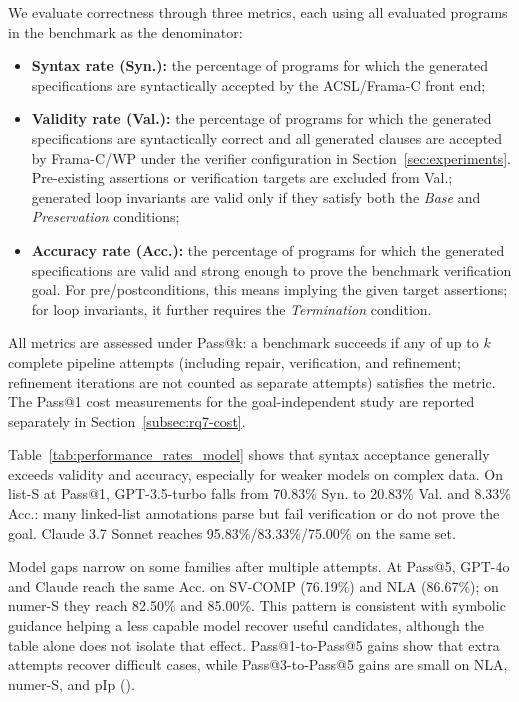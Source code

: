 We evaluate correctness through three metrics, each using all evaluated programs in the benchmark as the denominator:
\begin{itemize}
\item \textbf{Syntax rate (Syn.):} the percentage of programs for which the generated specifications are
syntactically accepted by the ACSL/Frama-C front end;
\item \textbf{Validity rate (Val.):} the percentage of programs for which the generated specifications are
syntactically correct and all generated clauses are accepted by Frama-C/WP under the
verifier configuration in Section~\ref{sec:experiments}. Pre-existing assertions
or verification targets are excluded from Val.; generated loop invariants are
valid only if they satisfy both the \textit{Base} and \textit{Preservation}
conditions;
\item \textbf{Accuracy rate (Acc.):} the percentage of programs for which the generated specifications are
valid and strong enough to prove the benchmark verification goal. For pre/postconditions,
this means implying the given target assertions; for loop invariants, it further
requires the \textit{Termination} condition.
\end{itemize}
All metrics are assessed under Pass@k: a benchmark succeeds if any of up to $k$
complete pipeline attempts (including repair, verification, and refinement;
refinement iterations are not counted as separate attempts) satisfies the metric.
The Pass@1 cost measurements for the goal-independent study are reported
separately in Section~\ref{subsec:rq7-cost}.











Table~\ref{tab:performance_rates_model} shows that syntax acceptance
generally exceeds validity and accuracy, especially for weaker models on
complex data. On list-S at Pass@1, GPT-3.5-turbo falls from 70.83\% Syn. to
20.83\% Val. and 8.33\% Acc.: many linked-list annotations parse but fail
verification or do not prove the goal. Claude 3.7 Sonnet reaches
95.83\%/83.33\%/75.00\% on the same set.

Model gaps narrow on some families after multiple attempts. At Pass@5,
GPT-4o and Claude reach the same Acc. on SV-COMP (76.19\%) and NLA
(86.67\%); on numer-S they reach 82.50\% and 85.00\%. This pattern is
consistent with symbolic guidance helping a less capable model recover
useful candidates, although the table alone does not isolate that effect.
Pass@1-to-Pass@5 gains show that extra attempts recover difficult cases,
while Pass@3-to-Pass@5 gains are small on NLA, numer-S, and pIp
().

